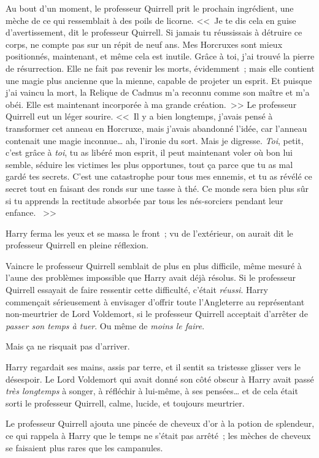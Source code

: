 Au bout d'un moment, le professeur Quirrell prit le prochain ingrédient, une mèche de ce qui ressemblait à des poils de licorne. <<~Je te dis cela en guise d'avertissement, dit le professeur Quirrell. Si jamais tu réussissais à détruire ce corps, ne compte pas sur un répit de neuf ans. Mes Horcruxes sont mieux positionnés, maintenant, et même cela est inutile. Grâce à toi, j'ai trouvé la pierre de résurrection. Elle ne fait pas revenir les morts, évidemment~; mais elle contient une magie plus ancienne que la mienne, capable de projeter un esprit. Et puisque j'ai vaincu la mort, la Relique de Cadmus m'a reconnu comme son maître et m'a obéi. Elle est maintenant incorporée à ma grande création.~>> Le professeur Quirrell eut un léger sourire. <<~Il y a bien longtemps, j'avais pensé à transformer cet anneau en Horcruxe, mais j'avais abandonné l'idée, car l'anneau contenait une magie inconnue… ah, l'ironie du sort. Mais je digresse. \emph{Toi}, petit, c'est grâce à \emph{toi}, tu as libéré mon esprit, il peut maintenant voler où bon lui semble, séduire les victimes les plus opportunes, tout ça parce que tu as mal gardé tes secrets. C'est une catastrophe pour tous mes ennemis, et tu as révélé ce secret tout en faisant des ronds sur une tasse à thé. Ce monde sera bien plus sûr si tu apprends la rectitude absorbée par tous les nés-sorciers pendant leur enfance. ~>>

Harry ferma les yeux et se massa le front~; vu de l'extérieur, on aurait dit le professeur Quirrell en pleine réflexion.

Vaincre le professeur Quirrell semblait de plus en plus difficile, même mesuré à l'aune des problèmes impossible que Harry avait déjà résolus. Si le professeur Quirrell essayait de faire ressentir cette difficulté, c'était \emph{réussi}. Harry commençait sérieusement à envisager d'offrir toute l'Angleterre au représentant non-meurtrier de Lord Voldemort, si le professeur Quirrell acceptait d'arrêter de \emph{passer son temps à tuer}. Ou même de \emph{moins le faire}.

Mais ça ne risquait pas d'arriver.

Harry regardait ses mains, assis par terre, et il sentit sa tristesse glisser vers le désespoir. Le Lord Voldemort qui avait donné son côté obscur à Harry avait passé \emph{très longtemps} à songer, à réfléchir à lui-même, à ses pensées… et de cela était sorti le professeur Quirrell, calme, lucide, et toujours meurtrier.

Le professeur Quirrell ajouta une pincée de cheveux d'or à la potion de splendeur, ce qui rappela à Harry que le temps ne s'était pas arrêté~; les mèches de cheveux se faisaient plus rares que les campanules.

